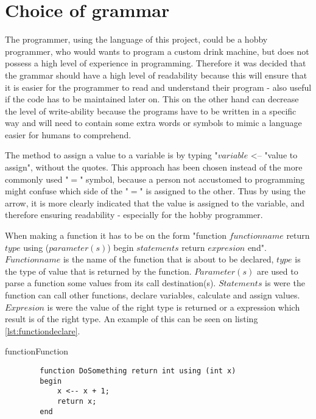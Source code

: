 \section{Choice of grammar}
\label{sec:grammachoice}
The programmer, using the language of this project, could be a hobby programmer, who would wants to program a custom drink machine, but does not possess a high level of experience in programming. Therefore it was decided that the grammar should have a high level of readability because this will ensure that it is easier for the programmer to read and understand their program - also useful if the code has to be maintained later on. This on the other hand can decrease the level of write-ability because the programs have to be written in a specific way and will need to contain some extra words or symbols to mimic a language easier for humans to comprehend.

The method to assign a value to a variable is by typing "$variable$ <-- "value to assign", without the quotes. This approach has been chosen instead of the more commonly used "$=$" symbol, because a person not accustomed to programming might confuse which side of the "$=$" is assigned to the other. Thus by using the arrow, it is more clearly indicated that the value is assigned to the variable, and therefore ensuring readability - especially for the hobby programmer.

When making a function it has to be on the form "function $functionname$ return $type$ using ($parameter(s)$) begin $statements$ return $expresion$ end". $Functionname$ is the name of the function that is about to be declared, $type$ is the type of value that is returned by the function. $Parameter(s)$ are used to parse a function some values from its call destination(s). $Statements$ is were the function can call other functions, declare variables, calculate and assign values. $Expresion$ is were the value of the right type is returned or a expression which result is of the right type.
An example of this can be seen on listing \ref{lst:functiondeclare}.

\begin{code}{function}{Function}
	\begin{lstlisting}
		function DoSomething return int using (int x)
		begin
			x <-- x + 1;
			return x;
		end
	\end{lstlisting}
	\caption{Example of function declaration in SPLAT}
	\label{lst:functiondeclare}
\end{code}

